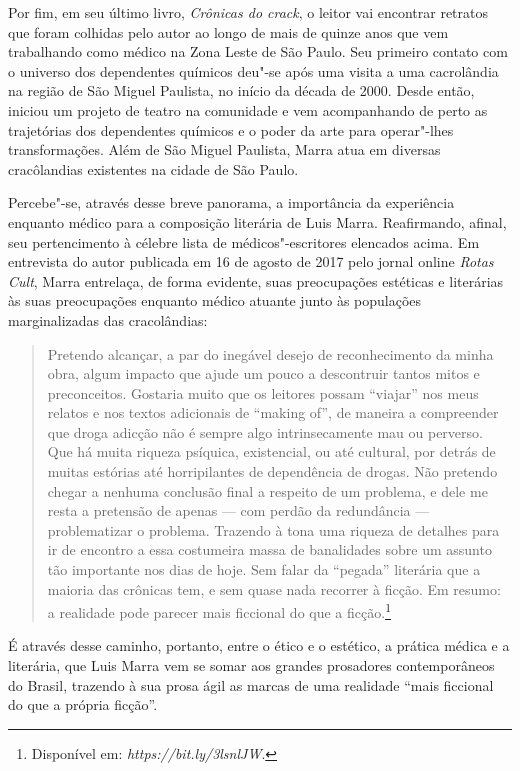 Por fim, em seu último livro, \textit{Crônicas do crack}, o leitor vai encontrar 
retratos que foram colhidas pelo autor ao longo de mais de quinze anos que vem trabalhando como médico na Zona Leste de São Paulo.
Seu primeiro contato com o universo dos dependentes químicos deu"-se após uma visita a uma cacrolândia na região de São Miguel Paulista, no início da década de 2000. Desde então, iniciou um projeto de teatro na comunidade e vem acompanhando de perto as trajetórias dos dependentes químicos e o poder da arte para operar"-lhes transformações. Além de São Miguel Paulista, Marra atua em diversas cracôlandias existentes na cidade de São Paulo.

Percebe"-se, através desse breve panorama, a importância da experiência enquanto médico para a composição literária de Luis Marra. Reafirmando, afinal, seu pertencimento à célebre lista de médicos"-escritores elencados acima.
Em entrevista do autor publicada em 16 de agosto de 2017 pelo jornal online \textit{Rotas Cult}, Marra entrelaça, de forma evidente, suas preocupações estéticas e literárias às suas preocupações enquanto médico atuante junto às populações marginalizadas das cracolândias:

\begin{quote}
Pretendo alcançar, a par do inegável desejo de reconhecimento da minha obra, algum impacto que ajude um pouco a descontruir tantos mitos e preconceitos. Gostaria muito que os leitores possam “viajar” nos meus relatos e nos textos adicionais de “making of”, de maneira a compreender que droga adicção não é sempre algo intrinsecamente mau ou perverso. Que há muita riqueza psíquica, existencial, ou até cultural, por detrás de muitas estórias até horripilantes de dependência de drogas. Não pretendo chegar a nenhuma conclusão final a respeito de um problema, e dele me resta a pretensão de apenas --- com perdão da redundância --- problematizar o problema. Trazendo à tona uma riqueza de detalhes para ir de encontro a essa costumeira massa de banalidades sobre um assunto tão importante nos dias de hoje. Sem falar da “pegada” literária que a maioria das crônicas tem, e sem quase nada recorrer à ficção. Em resumo: a realidade pode parecer mais ficcional do que a ficção.\footnote{Disponível em: \textit{https://bit.ly/3lsnlJW}.}
\end{quote}

É através desse caminho, portanto, entre o ético e o estético, a prática médica e a literária, que Luis Marra vem se somar aos grandes prosadores contemporâneos do Brasil, trazendo à sua prosa ágil as marcas de uma realidade ``mais ficcional do que a própria ficção''.

